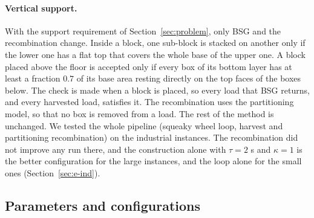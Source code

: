\paragraph{Vertical support.}
With the support requirement of Section~\ref{sec:problem}, only BSG and the recombination change.
Inside a block, one sub-block is stacked on another only if the lower one has a flat top that
covers the whole base of the upper one. A block placed above the floor is accepted only if every
box of its bottom layer has at least a fraction $0.7$ of its base area resting directly on the top
faces of the boxes below. The check is made when a block is placed, so every load that BSG returns,
and every harvested load, satisfies it. The recombination uses the partitioning model, so that no
box is removed from a load. The rest of the method is unchanged.
We tested the whole pipeline (squeaky wheel loop, harvest and partitioning recombination) on the industrial instances. The recombination did not improve any run there, and the construction alone with $\tau=2$ s and $\kappa=1$
is the better configuration for the large instances, and the loop alone for the small ones (Section~\ref{sec:e-ind}).

\subsection{Parameters and configurations}
\label{sec:m-params}

